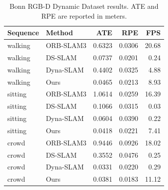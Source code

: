 \begin{table}[t]
\centering
\caption{Bonn RGB-D Dynamic Dataset results. ATE and RPE are reported in meters.}
\label{tab:bonn_dynamic_results}
\begin{tabular}{llrrr}
\toprule
Sequence & Method & ATE & RPE & FPS \\
\midrule
walking & ORB-SLAM3 & 0.6323 & 0.0306 & 20.68 \\
walking & DS-SLAM & 0.0737 & 0.0201 & 0.24 \\
walking & Dyna-SLAM & 0.4402 & 0.0325 & 4.88 \\
walking & Ours & 0.0465 & 0.0213 & 8.93 \\
sitting & ORB-SLAM3 & 1.0614 & 0.0259 & 16.39 \\
sitting & DS-SLAM & 0.1066 & 0.0315 & 0.03 \\
sitting & Dyna-SLAM & 0.0604 & 0.0390 & 0.22 \\
sitting & Ours & 0.0418 & 0.0221 & 7.41 \\
crowd & ORB-SLAM3 & 0.9446 & 0.0926 & 18.02 \\
crowd & DS-SLAM & 0.3552 & 0.0476 & 0.25 \\
crowd & Dyna-SLAM & 0.0331 & 0.0220 & 0.29 \\
crowd & Ours & 0.0381 & 0.0183 & 11.12 \\
\bottomrule
\end{tabular}
\end{table}
